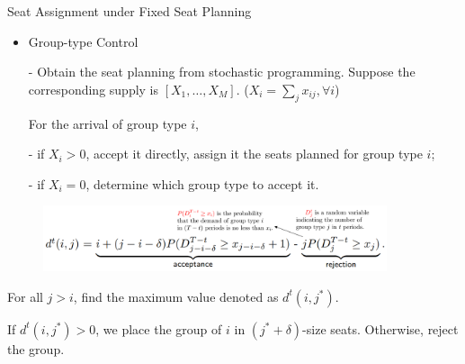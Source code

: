   \begin{frame}{Seat Assignment under Fixed Seat Planning}
    \small
    \begin{itemize}
      \item Group-type Control
      \item[-] Obtain the seat planning from stochastic programming. Suppose the corresponding supply is $[X_1, \ldots, X_M]$. ($X_{i} = \sum_{j} x_{ij}, \forall i$)
      
      For the arrival of group type $i$,

      \item[-] if $X_i > 0$, accept it directly, assign it the seats planned for group type $i$;
      \item[-] if $X_i = 0$, determine which group type to accept it.
    \end{itemize}



    \vspace{-0.5cm}

    \begin{figure}[h]
      \centering
      \includegraphics[width = 0.9\textwidth]{./images/d_ij.png}
    \end{figure}

    \vspace{-0.1cm}

    For all $j > i$, find the maximum value denoted as $d^{t}(i, j^{*})$.
    
    If $d^{t}(i, j^{*}) > 0$, we place the group of $i$ in $(j^{*} + \delta)$-size seats. Otherwise, reject the group.

  \end{frame}
  
